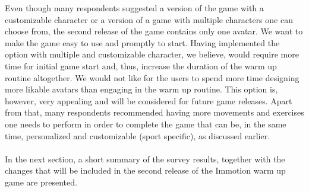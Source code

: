 Even though many respondents suggested a version of the game with a customizable character or a version of a game with multiple characters one can choose from, the second release of the game contains only one avatar. We want to make the game easy to use and promptly to start. Having implemented the option with multiple and customizable character, we believe, would require more time for initial game start and, thus, increase the duration of the warm up routine altogether. We would not like for the users to spend more time designing more likable avatars than engaging in the warm up routine. This option is, however, very appealing and will be considered for future game releases. Apart from that, many respondents recommended having more movements and exercises one needs to perform in order to complete the game that can be, in the same time, personalized and customizable (sport specific), as discussed earlier.\\\\In the next section, a short summary of the survey results, together with the changes that will be included in the second release of the Immotion warm up game are presented. \pagebreak
